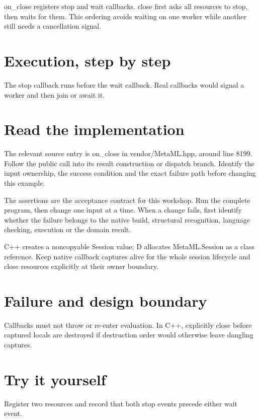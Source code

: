 \clearpage
{}
on\_close registers stop and wait callbacks. close first asks all resources to stop, then waits for them. This ordering avoids waiting on one worker while another still needs a cancellation signal.


\section*{Execution, step by step}
The stop callback runs before the wait callback. Real callbacks would signal a worker and then join or await it.

\section*{Read the implementation}
The relevant source entry is on\_close in vendor/MetaML.hpp, around line 8199. Follow the public call into its result construction or dispatch branch. Identify the input ownership, the success condition and the exact failure path before changing this example.

The assertions are the acceptance contract for this workshop. Run the complete program, then change one input at a time. When a change fails, first identify whether the failure belongs to the native build, structural recognition, language checking, execution or the domain result.

\clearpage
{}
C++ creates a noncopyable Session value; D allocates MetaML.Session as a class reference. Keep native callback captures alive for the whole session lifecycle and close resources explicitly at their owner boundary.


\section*{Failure and design boundary}
Callbacks must not throw or re-enter evaluation. In C++, explicitly close before captured locals are destroyed if destruction order would otherwise leave dangling captures.

\section*{Try it yourself}
Register two resources and record that both stop events precede either wait event.


